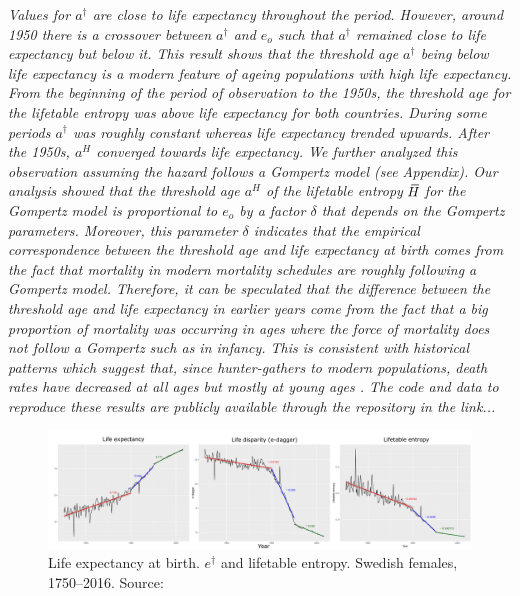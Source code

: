 \documentclass[a4paper,twoside, openright, 12pt, leqno]{article}
\newcommand*\xbar[1]{%
   \hbox{%
     \vbox{%
       \hrule height 0.5pt %
       \kern0.3ex%
       \hbox{%
         \kern-0.28em%
         \ensuremath{#1}%
         \kern-0.05em%
       }%
     }%
   }%
}
\begin{document}
\textit{Values for $a^\dagger$ are close to life expectancy throughout the period. However, around 1950 there is a crossover between $a^\dagger$ and $e_o$ such that $a^\dagger$ remained close to life expectancy but below it. This result shows that the threshold age $a^\dagger$ being below life expectancy is a modern feature of ageing populations with high life expectancy. From the beginning of the period of observation to the 1950s, the threshold age for the lifetable entropy was above life expectancy for both countries. During some periods $a^\dagger$ was roughly constant whereas life expectancy trended upwards. After the 1950s, $a^H$ converged towards life expectancy. We further analyzed this observation assuming the hazard follows a Gompertz model (see Appendix). Our analysis showed that the threshold age $a^H$ of the lifetable entropy $\,\xbar{H}$ for the Gompertz model is proportional to $e_o$ by a factor $\delta$ that depends on the Gompertz parameters. Moreover, this parameter $\delta$ indicates that the empirical correspondence between the threshold age and life expectancy at birth  comes from the fact that mortality in modern mortality schedules are roughly following a Gompertz model. Therefore, it can be speculated that the difference between the threshold age and life expectancy in earlier years come from the fact that a big proportion of mortality was occurring in ages where the force of mortality does not follow a Gompertz such as in infancy. This is consistent with historical patterns which suggest that, since hunter-gathers to modern populations, death rates have decreased at all ages but mostly at young ages \citep{burger2012human}. The code and data to reproduce these results are publicly available through the repository in the link...}

 
\FloatBarrier

\begin{figure}[h!]
	\centering
	\includegraphics[scale=.31]{Figs_JA}
	\caption{Life expectancy at birth. $e^\dagger$ and lifetable entropy. Swedish females, 1750--2016. Source: \cite{HMD}}
	\label{fig:Fig2}
\end{figure}
\end{document}
